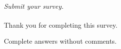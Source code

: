 \documentclass[headsepline,titlepage,twoside,12pt,toc=flat,headings=normal]{scrreprt}
\begin{document}
\paragraph{}
\emph{Submit your survey.}

\paragraph{}
Thank you for completing this survey.


\clearpage
\begin{sidewaystable}
\caption{Complete answers without comments.}
\label{tab:results}
\tiny
\setlength{\tabcolsep}{2pt}

\end{sidewaystable}
\restoregeometry


\end{document}
